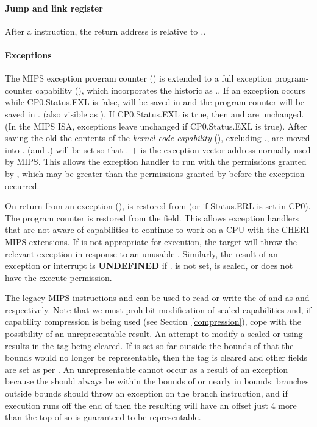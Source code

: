 \paragraph{Jump and link register}
After a  instruction, the return address is relative
to \emph{\PCC{}.\cbase}.

\paragraph{Exceptions}
The MIPS exception program counter (\EPC{}) is extended to a full exception
program-counter capability (\EPCC{}), which incorporates the historic \EPC{}
as \EPCC{}.\coffset{}.
If an exception occurs while CP0.Status.EXL is false, \PCC{} will be
saved in \EPCC{} and the program counter will be saved in \EPCC{}.\coffset{}
(also visible as \EPC{}). If CP0.Status.EXL is true, then \EPCC{} and \EPC{} are unchanged.
(In the MIPS ISA, exceptions leave \EPC{} unchanged if CP0.Status.EXL is true).
After saving the old \PCC{} the contents of the {\em kernel code
capability} (\KCC{}), excluding \KCC{}.\coffset{}, are moved into \PCC{}.
\PC{} (and \PCC.\coffset{}) will be set so that \PCC{}.\cbase{} $+$
\PC{} is the exception vector address normally used by MIPS.
This allows the exception handler to run with the permissions granted by
\KCC{}, which may be greater than the permissions granted by \PCC{} before
the exception occurred.

On return from an exception (), \PCC{} is restored from
\EPCC{} (or \ErrorEPCC{} if Status.ERL is set in CP0).
The program counter is restored
from the \coffset{} field.
This allows exception handlers that are not aware of capabilities to continue
to work on a CPU with the CHERI-MIPS extensions.
If \EPCC{} is not appropriate for execution, the target will
throw the relevant exception in response to an unusable \PCC{}.
Similarly, the result of an exception or interrupt is \textbf{UNDEFINED} if
\KCC{}.\ctag{} is not set, \KCC{} is sealed, or \KCC{} does not have the
execute permission.

The legacy MIPS instructions  and
 can
be used to read or write the \coffset{} of \EPCC{} and \ErrorEPCC{}
as \EPC{} and \ErrorEPC{} respectively. Note
that we must prohibit modification of sealed capabilities and, if
capability compression is being used (see Section~\ref{compression}), cope
with the possibility of an unrepresentable result.
An attempt to modify a sealed \EPCC{} or \ErrorEPCC{} using
results in the tag being cleared.
If \EPC{} is set so far outside the bounds of \EPCC{} that the bounds would no longer
be representable, then the tag is cleared and other fields are set as per .
An unrepresentable \EPCC{} cannot occur as a result of an exception because the \PC{}
should always be within the bounds of \PCC{} or nearly in bounds:
branches outside \PCC{} bounds should throw an exception on the branch instruction,
and if execution runs off the end of
\PCC{} then the resulting \EPCC{} will have an offset just 4 more than
the top of \PCC{} so is guaranteed to be representable.

